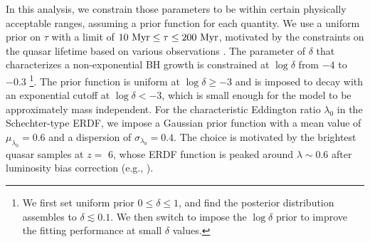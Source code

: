 \documentclass[twocolumn, twocolappendix]{aastex63}
\newcommand{\tlife}{\tau}
\newcommand{\red}[1]{\textcolor{red}{ #1}}
\newcommand{\blue}[1]{\textcolor{blue}{ #1}}
\begin{document}
\begin{CJK*}{UTF8}{gbsn}
In this analysis, we constrain those parameters to be within certain physically acceptable ranges, 
assuming a prior function for each quantity.
We use a uniform prior on $\tlife$ with a limit of $10~{\rm Myr} \leq \tlife \leq 200~{\rm Myr}$,
motivated by the constraints on the quasar lifetime based on various observations
\citep[e.g.,][]{2004cbhg.symp..169M}.
The parameter of $\delta$ that characterizes a non-exponential BH growth 
is constrained at $\log \delta$ from $-4$ to $-0.3$
\footnote[2]{ We first set uniform prior $0\leq \delta \leq 1$, 
and find the posterior distribution assembles to $\delta \lesssim 0.1$.
We then switch to impose the $\log \delta$ prior to improve the fitting performance at small $\delta$ values.}.
The prior function is uniform at $\log \delta \geq -3$ and is imposed to decay with an exponential cutoff at $\log \delta < -3$,
which is small enough for the model to be approximately mass independent.
For the characteristic Eddington ratio $\lambda_0$ in the Schechter-type ERDF, 
we impose a Gaussian prior function with a mean value of $\mu_{\lambda_0}=0.6$ and a dispersion of $\sigma_{\lambda_0}=0.4$.
The choice is motivated by the brightest quasar samples at $z=$ 6, whose ERDF function is peaked around $\lambda \sim 0.6$ 
after luminosity bias correction (e.g., ).

\end{CJK*}
\end{document}
